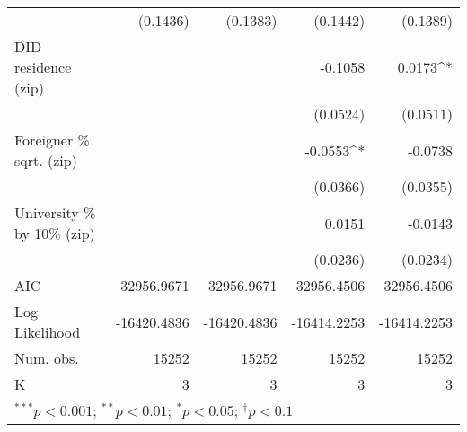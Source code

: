 \begin{tabular}{l D{.}{.}{6.11} D{.}{.}{6.11} D{.}{.}{6.11} D{.}{.}{6.11}}
                                  & (0.1436)         & (0.1383)          & (0.1442)         & (0.1389)          \\
DID residence (zip)               &                  &                   & -0.1058          & 0.0173^{*}        \\
                                  &                  &                   & (0.0524)         & (0.0511)          \\
Foreigner \% sqrt. (zip)          &                  &                   & -0.0553^{*}      & -0.0738           \\
                                  &                  &                   & (0.0366)         & (0.0355)          \\
University \% by 10\% (zip)       &                  &                   & 0.0151           & -0.0143           \\
                                  &                  &                   & (0.0236)         & (0.0234)          \\
\midrule
AIC                               & 32956.9671       & 32956.9671        & 32956.4506       & 32956.4506        \\
Log Likelihood                    & -16420.4836      & -16420.4836       & -16414.2253      & -16414.2253       \\
Num. obs.                         & 15252            & 15252             & 15252            & 15252             \\
K                                 & 3                & 3                 & 3                & 3                 \\
\bottomrule
{}
\end{tabular}
